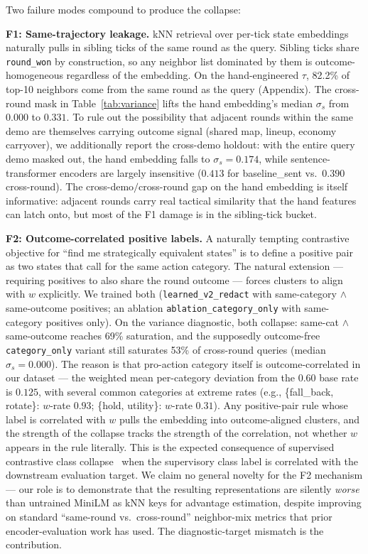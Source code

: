 \documentclass{article}
\begin{document}
Two failure modes compound to produce the collapse:

\textbf{F1: Same-trajectory leakage.} kNN retrieval over per-tick state embeddings naturally pulls in sibling ticks of the same round as the query. Sibling ticks share \texttt{round\_won} by construction, so any neighbor list dominated by them is outcome-homogeneous regardless of the embedding. On the hand-engineered $\tau$, 82.2\% of top-10 neighbors come from the same round as the query (Appendix). The cross-round mask in Table~\ref{tab:variance} lifts the hand embedding's median $\sigma_s$ from $0.000$ to $0.331$. To rule out the possibility that adjacent rounds within the same demo are themselves carrying outcome signal (shared map, lineup, economy carryover), we additionally report the cross-demo holdout: with the entire query demo masked out, the hand embedding falls to $\sigma_s = 0.174$, while sentence-transformer encoders are largely insensitive ($0.413$ for baseline\_sent vs.\ $0.390$ cross-round). The cross-demo$/$cross-round gap on the hand embedding is itself informative: adjacent rounds carry real tactical similarity that the hand features can latch onto, but most of the F1 damage is in the sibling-tick bucket.

\textbf{F2: Outcome-correlated positive labels.} A naturally tempting contrastive objective for ``find me strategically equivalent states'' is to define a positive pair as two states that call for the same action category. The natural extension --- requiring positives to also share the round outcome --- forces clusters to align with $w$ explicitly. We trained both (\texttt{learned\_v2\_redact} with same-category $\wedge$ same-outcome positives; an ablation \texttt{ablation\_category\_only} with same-category positives only). On the variance diagnostic, both collapse: same-cat $\wedge$ same-outcome reaches 69\% saturation, and the supposedly outcome-free \texttt{category\_only} variant still saturates 53\% of cross-round queries (median $\sigma_s = 0.000$). The reason is that pro-action category itself is outcome-correlated in our dataset --- the weighted mean per-category deviation from the 0.60 base rate is $0.125$, with several common categories at extreme rates (e.g., \{fall\_back, rotate\}: $w$-rate $0.93$; \{hold, utility\}: $w$-rate $0.31$). Any positive-pair rule whose label is correlated with $w$ pulls the embedding into outcome-aligned clusters, and the strength of the collapse tracks the strength of the correlation, not whether $w$ appears in the rule literally. This is the expected consequence of supervised contrastive class collapse~\cite{khosla2020supervised,graf2021dissecting} when the supervisory class label is correlated with the downstream evaluation target. We claim no general novelty for the F2 mechanism --- our role is to demonstrate that the resulting representations are silently \emph{worse} than untrained MiniLM as kNN keys for advantage estimation, despite improving on standard ``same-round vs.\ cross-round'' neighbor-mix metrics that prior encoder-evaluation work has used. The diagnostic-target mismatch is the contribution.
\end{document}
